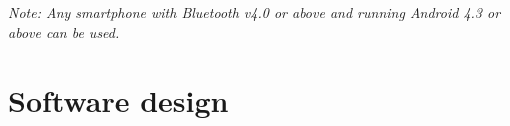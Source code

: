 \emph{Note: Any smartphone with Bluetooth v4.0 or above and running Android 4.3 or above can be used.}



\section{Software design}
\label{sec:software}
